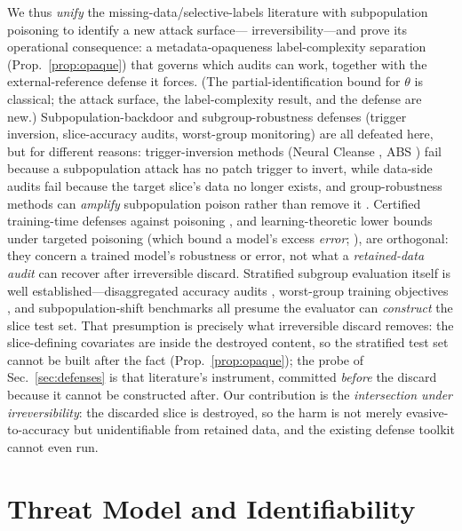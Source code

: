 \documentclass[conference]{IEEEtran}
\begin{document}
We thus \emph{unify} the
missing-data/selective-labels literature with subpopulation poisoning to identify a new attack surface---
irreversibility---and prove its operational consequence: a metadata-opaqueness label-complexity separation
(Prop.~\ref{prop:opaque}) that governs which audits can work, together with the external-reference defense it
forces. (The partial-identification bound for $\theta$ is classical; the attack surface, the label-complexity
result, and the defense are new.) Subpopulation-backdoor and
subgroup-robustness defenses (trigger inversion, slice-accuracy audits, worst-group monitoring) are all
defeated here, but for different reasons: trigger-inversion methods (Neural Cleanse \cite{wang2019}, ABS \cite{liu2019}) fail because a
subpopulation attack has no patch trigger to invert, while data-side audits fail because the target slice's
data no longer exists, and group-robustness methods can \emph{amplify} subpopulation poison rather than remove it
\cite{panaitescu2024}. Certified training-time defenses against poisoning \cite{levine2021}, and
learning-theoretic lower bounds under targeted poisoning (which bound a model's excess \emph{error}; \cite{chornomaz2025}), are orthogonal: they concern a trained model's robustness or error, not what a \emph{retained-data
audit} can recover after irreversible discard. Stratified subgroup evaluation itself is well
established---disaggregated accuracy audits \cite{buolamwini2018}, worst-group training objectives
\cite{sagawa2020}, and subpopulation-shift benchmarks \cite{koh2021} all presume the evaluator can
\emph{construct} the slice test set. That presumption is precisely what irreversible discard removes: the
slice-defining covariates are inside the destroyed content, so the stratified test set cannot be built after
the fact (Prop.~\ref{prop:opaque}); the probe of Sec.~\ref{sec:defenses} is that literature's instrument,
committed \emph{before} the discard because it cannot be constructed after. Our
contribution is the \emph{intersection under irreversibility}: the discarded slice is destroyed, so the
harm is not merely evasive-to-accuracy but unidentifiable from retained data, and the existing defense
toolkit cannot even run.

\section{Threat Model and Identifiability}\label{sec:threat}
\end{document}
